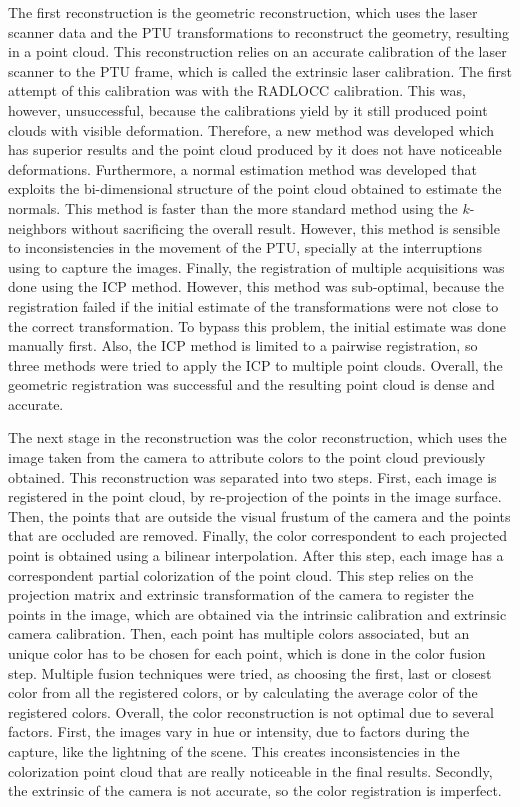 The first reconstruction is the geometric reconstruction, which uses the laser scanner data and the PTU transformations to reconstruct the geometry, resulting in a point cloud. This reconstruction relies on an accurate calibration of the laser scanner to the PTU frame, which is called the extrinsic laser calibration. The first attempt of this calibration was with the RADLOCC calibration. This was, however, unsuccessful, because the calibrations yield by it still produced point clouds with visible deformation. Therefore, a new method was developed which has superior results and the point cloud produced by it does not have noticeable deformations. Furthermore, a normal estimation method was developed that exploits the bi-dimensional structure of the point cloud obtained to estimate the normals. This method is faster than the more standard method using the $k$-neighbors without sacrificing the overall result. However, this method is sensible to inconsistencies in the movement of the PTU, specially at the interruptions using to capture the images. Finally, the registration of multiple acquisitions was done using the ICP method. However, this method was sub-optimal, because the registration failed if the initial estimate of the transformations were not close to the correct transformation. To bypass this problem, the initial estimate was done manually first. Also, the ICP method is limited to a pairwise registration, so three methods were tried to apply the ICP to multiple point clouds. Overall, the geometric registration was successful and the resulting point cloud is dense and accurate. 

The next stage in the reconstruction was the color reconstruction, which uses the image taken from the camera to attribute colors to the point cloud previously obtained. This reconstruction was separated into two steps. First, each image is registered in the point cloud, by re-projection of the points in the image surface. Then, the points that are outside the visual frustum of the camera and the points that are occluded are removed. Finally, the color correspondent to each projected point is obtained using a bilinear interpolation. After this step, each image has a correspondent partial colorization of the point cloud. This step relies on the projection matrix and extrinsic transformation of the camera to register the points in the image, which are obtained via the intrinsic calibration and extrinsic camera calibration. Then, each point has multiple colors associated, but an unique color has to be chosen for each point, which is done in the color fusion step. Multiple fusion techniques were tried, as choosing the first, last or closest color from all the registered colors, or by calculating the average color of the registered colors. Overall, the color reconstruction is not optimal due to several factors. First, the images vary in hue or intensity, due to factors during the capture, like the lightning of the scene. This creates inconsistencies in the colorization point cloud that are really noticeable in the final results. Secondly, the extrinsic of the camera is not accurate, so the color registration is imperfect. 

